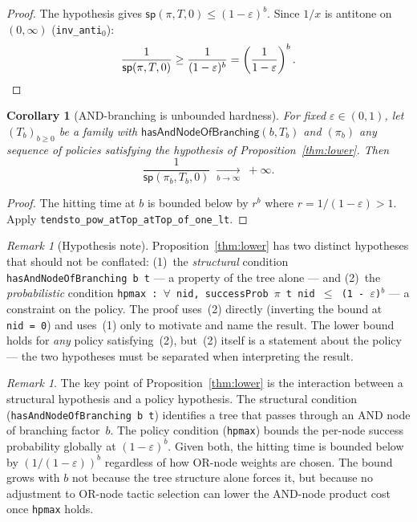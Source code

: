 \documentclass[reqno,11pt]{amsart}
\newcommand{\sP}{\mathsf{sp}}
\newcommand{\hasAnd}{\mathsf{hasAndNodeOfBranching}}
\theoremstyle{plain}
\newtheorem{corollary}[theorem]{Corollary}
\theoremstyle{definition}
\theoremstyle{remark}
\newtheorem{remark}[theorem]{Remark}
\begin{document}
\begin{proof}
The hypothesis gives $\sP(\pi, T, 0) \le (1-\varepsilon)^b$. Since $1/x$ is antitone on $(0,\infty)$ (\texttt{inv\_anti$_0$}):
\[
\frac{1}{\sP(\pi,T,0)} \ge \frac{1}{(1-\varepsilon)^b} = \left(\frac{1}{1-\varepsilon}\right)^b. \qedhere
\]
\end{proof}

\begin{corollary}[AND-branching is unbounded hardness]\label{cor:unbounded}
For fixed $\varepsilon \in (0,1)$, let $(T_b)_{b \ge 0}$ be a family with $\hasAnd(b, T_b)$ and $(\pi_b)$ any sequence of policies satisfying the hypothesis of Proposition~\ref{thm:lower}. Then
\[
\frac{1}{\sP(\pi_b, T_b, 0)} \;\xrightarrow[b\to\infty]{}\; +\infty.
\]
\end{corollary}

\begin{proof}
The hitting time at $b$ is bounded below by $r^b$ where $r = 1/(1-\varepsilon) > 1$. Apply \texttt{tendsto\_pow\_atTop\_atTop\_of\_one\_lt}.
\end{proof}

\begin{remark}[Hypothesis note]
Proposition~\ref{thm:lower} has two distinct hypotheses that should not be conflated: (1)~the \emph{structural} condition \texttt{hasAndNodeOfBranching b t} --- a property of the tree alone --- and (2)~the \emph{probabilistic} condition \texttt{hpmax~:~$\forall$~nid,~successProb~$\pi$~t~nid~$\le$~(1~-~$\varepsilon$)$^b$} --- a constraint on the policy. The proof uses~(2) directly (inverting the bound at \texttt{nid~=~0}) and uses~(1) only to motivate and name the result. The lower bound holds for \emph{any} policy satisfying~(2), but~(2) itself is a statement about the policy --- the two hypotheses must be separated when interpreting the result.
\end{remark}

\begin{remark}
The key point of Proposition~\ref{thm:lower} is the interaction between a structural hypothesis and a policy hypothesis. The structural condition (\texttt{hasAndNodeOfBranching b t}) identifies a tree that passes through an AND node of branching factor~$b$. The policy condition (\texttt{hpmax}) bounds the per-node success probability globally at $(1-\varepsilon)^b$. Given both, the hitting time is bounded below by $(1/(1-\varepsilon))^b$ regardless of how OR-node weights are chosen. The bound grows with $b$ not because the tree structure alone forces it, but because no adjustment to OR-node tactic selection can lower the AND-node product cost once \texttt{hpmax} holds.
\end{remark}
\end{document}
